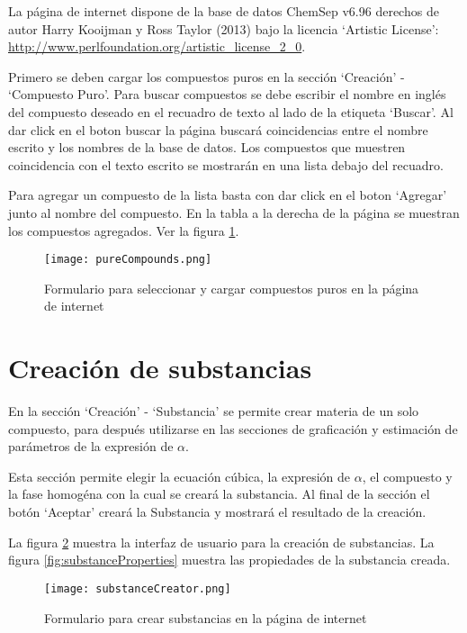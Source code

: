 	La página de internet dispone de la base de datos ChemSep v6.96 derechos de autor  Harry Kooijman y Ross Taylor (2013) bajo la licencia `Artistic License': \url{ http://www.perlfoundation.org/artistic_license_2_0}.

	Primero se deben cargar los compuestos puros en la sección `Creación' - `Compuesto Puro'. Para buscar compuestos se debe escribir el nombre en inglés del compuesto deseado en el recuadro de texto al lado de la etiqueta `Buscar'. Al dar click en el boton buscar la página buscará coincidencias entre el nombre escrito y los nombres de la base de datos. Los compuestos que muestren coincidencia con el texto escrito se mostrarán en una lista debajo del recuadro.

	Para agregar un compuesto de la lista basta con dar click en el boton `Agregar' junto al nombre del compuesto. En la tabla a la derecha de la página se muestran los compuestos agregados. Ver la figura \ref{fig:pureCompounds}.

	\begin{figure}[!h]
		\centering
		\texttt{[image: pureCompounds.png]}
		\caption{Formulario para seleccionar y cargar compuestos puros en la página de internet}
		\label{fig:pureCompounds}
	\end{figure}

\section{Creación de substancias}\label{sec:webSubstanceCreator}
	
	En la sección `Creación' - `Substancia' se permite crear materia de un solo compuesto, para después utilizarse en las secciones de graficación y estimación de parámetros de la expresión de $\alpha$.

	Esta sección permite elegir la ecuación cúbica, la expresión de $\alpha$, el compuesto y la fase homogéna con la cual se creará la substancia. Al final de la sección el botón `Aceptar' creará la Substancia y mostrará el resultado de la creación.

	La figura \ref{fig:substanceCreator} muestra la interfaz de usuario para la creación de substancias. La figura \ref{fig:substanceProperties} muestra las propiedades de la substancia creada.

	\begin{figure}[!h]
		\texttt{[image: substanceCreator.png]}
		\caption{Formulario para crear substancias en la página de internet}
		\label{fig:substanceCreator}
	\end{figure}

